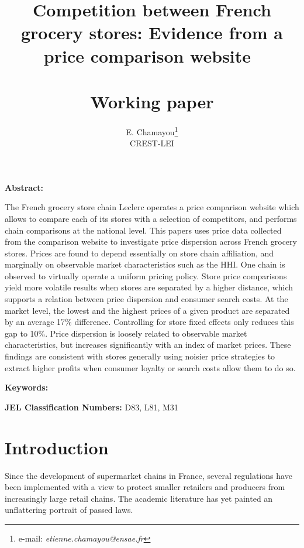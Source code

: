 \documentclass[english]{article}
\begin{document}
\title{Competition between French grocery stores: Evidence from a price comparison website\ \\ \ \\Working paper}
\author{E. Chamayou\thanks{e-mail:
\textit{etienne.chamayou@ensae.fr}} \\ CREST-LEI}
\maketitle

\sloppy%

\onehalfspacing

\textbf{Abstract:}

The French grocery store chain Leclerc operates a price comparison website which allows to compare each of its stores with a selection of competitors, and performs chain comparisons at the national level. This papers uses price data collected from the comparison website to investigate price dispersion across French grocery stores. Prices are found to depend essentially on store chain affiliation, and marginally on observable market characteristics such as the HHI. One chain is observed to virtually operate a uniform pricing policy. Store price comparisons yield more volatile results when stores are separated by a higher distance, which supports a relation between price dispersion and consumer search costs. At the market level, the lowest and the highest prices of a given product are separated by an average 17\% difference. Controlling for store fixed effects only reduces this gap to 10\%. Price dispersion is loosely related to observable market characteristics, but increases significantly with an index of market prices. These findings are consistent with stores generally using noisier price strategies to extract higher profits when consumer loyalty or search costs allow them to do so.

\strut

\textbf{Keywords:}

\strut

\textbf{JEL Classification Numbers:} D83, L81, M31

\pagebreak%

\section{Introduction}

Since the development of supermarket chains in France, several regulations have been implemented with a view to protect smaller retailers and producers from increasingly large retail chains. The academic literature has yet painted an unflattering portrait of passed laws.
\end{document}
